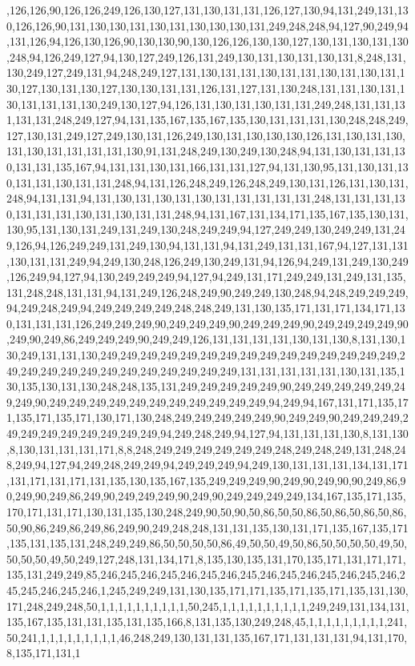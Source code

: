 ,126,126,90,126,126,249,126,130,127,131,130,131,131,126,127,130,94,131,249,131,130,126,126,90,131,130,130,131,130,131,130,130,130,131,249,248,248,94,127,90,249,94,131,126,94,126,130,126,90,130,130,90,130,126,126,130,130,127,130,131,130,131,130,248,94,126,249,127,94,130,127,249,126,131,249,130,131,130,131,130,131,8,248,131,130,249,127,249,131,94,248,249,127,131,130,131,131,130,131,131,130,131,130,131,130,127,130,131,130,127,130,130,131,131,126,131,127,131,130,248,131,131,130,131,130,131,131,131,130,249,130,127,94,126,131,130,131,130,131,131,249,248,131,131,131,131,131,248,249,127,94,131,135,167,135,167,135,130,131,131,131,130,248,248,249,127,130,131,249,127,249,130,131,126,249,130,131,130,130,130,126,131,130,131,130,131,130,131,131,131,131,130,91,131,248,249,130,249,130,248,94,131,130,131,131,130,131,131,135,167,94,131,131,130,131,166,131,131,127,94,131,130,95,131,130,131,130,131,131,130,131,131,248,94,131,126,248,249,126,248,249,130,131,126,131,130,131,248,94,131,131,94,131,130,131,130,131,130,131,131,131,131,131,248,131,131,131,130,131,131,131,130,131,130,131,131,248,94,131,167,131,134,171,135,167,135,130,131,130,95,131,130,131,249,131,249,130,248,249,249,94,127,249,249,130,249,249,131,249,126,94,126,249,249,131,249,130,94,131,131,94,131,249,131,131,167,94,127,131,131,130,131,131,249,94,249,130,248,126,249,130,249,131,94,126,94,249,131,249,130,249,126,249,94,127,94,130,249,249,249,94,127,94,249,131,171,249,249,131,249,131,135,131,248,248,131,131,94,131,249,126,248,249,90,249,249,130,248,94,248,249,249,249,94,249,248,249,94,249,249,249,249,248,248,249,131,130,135,171,131,171,134,171,130,131,131,131,126,249,249,249,90,249,249,249,90,249,249,249,90,249,249,249,249,90,249,90,249,86,249,249,249,90,249,249,126,131,131,131,131,130,131,130,8,131,130,130,249,131,131,130,249,249,249,249,249,249,249,249,249,249,249,249,249,249,249,249,249,249,249,249,249,249,249,249,249,249,249,131,131,131,131,131,130,131,135,130,135,130,131,130,248,248,135,131,249,249,249,249,249,90,249,249,249,249,249,249,249,90,249,249,249,249,249,249,249,249,249,249,249,94,249,94,167,131,171,135,171,135,171,135,171,130,171,130,248,249,249,249,249,249,90,249,249,90,249,249,249,249,249,249,249,249,249,249,249,94,249,248,249,94,127,94,131,131,131,130,8,131,130,8,130,131,131,131,171,8,8,248,249,249,249,249,249,249,248,249,248,249,131,248,248,249,94,127,94,249,248,249,249,94,249,249,249,94,249,130,131,131,131,134,131,171,131,171,131,171,131,135,130,135,167,135,249,249,249,90,249,90,249,90,90,249,86,90,249,90,249,86,249,90,249,249,249,90,249,90,249,249,249,249,134,167,135,171,135,170,171,131,171,130,131,135,130,248,249,90,50,90,50,86,50,50,86,50,86,50,86,50,86,50,90,86,249,86,249,86,249,90,249,248,248,131,131,135,130,131,171,135,167,135,171,135,131,135,131,248,249,249,86,50,50,50,50,86,49,50,50,49,50,86,50,50,50,50,49,50,50,50,50,49,50,249,127,248,131,134,171,8,135,130,135,131,170,135,171,131,171,171,135,131,249,249,85,246,245,246,245,246,245,246,245,246,245,246,245,246,245,246,245,245,246,245,246,1,245,249,249,131,130,135,171,171,135,171,135,171,135,131,130,171,248,249,248,50,1,1,1,1,1,1,1,1,1,1,50,245,1,1,1,1,1,1,1,1,1,1,249,249,131,134,131,135,167,135,131,131,135,131,135,166,8,131,135,130,249,248,45,1,1,1,1,1,1,1,1,1,241,50,241,1,1,1,1,1,1,1,1,1,46,248,249,130,131,131,135,167,171,131,131,131,94,131,170,8,135,171,131,1